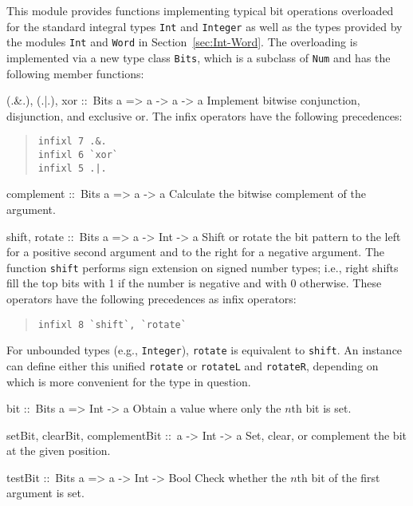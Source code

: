 \documentclass[a4paper,twoside]{article}
\makeatletter
\newcommand{\code}[1]{\texttt{#1}}      %
\newenvironment{codedesc}{%
  \list{}{\labelwidth\z@
    \let\makelabel\codedesclabel}
  }{%
  \endlist
  }
\newcommand*{\codedesclabel}[1]{%
  \hspace{-\leftmargin}
  \parbox[b]{\labelwidth}{\makebox[0pt][l]{\code{#1}}\\}\hfil\relax
  }
\makeatother
\begin{document}
This module provides functions implementing typical bit operations overloaded
for the standard integral types \code{Int} and \code{Integer} as well as the
types provided by the modules \code{Int} and \code{Word} in
Section~\ref{sec:Int-Word}.  The overloading is implemented via a new type
class \code{Bits}, which is a subclass of \code{Num} and has the following
member functions:
%
\begin{codedesc}
\item[(.\&.), (.|.), xor ::\ Bits a => a -> a -> a]  Implement bitwise
  conjunction, disjunction, and exclusive or.  The infix operators have the
  following precedences:
  \begin{quote}
\begin{verbatim}
infixl 7 .&.
infixl 6 `xor`
infixl 5 .|.
\end{verbatim}
  \end{quote}
  
\item[complement ::\ Bits a => a -> a] Calculate the bitwise complement of the
  argument.

\item[shift, rotate ::\ Bits a => a -> Int -> a] Shift or rotate the bit
  pattern to the left for a positive second argument and to the right for a
  negative argument.  The function \code{shift} performs sign extension on
  signed number types; i.e., right shifts fill the top bits with 1 if the
  number is negative and with 0 otherwise.  These operators have the following
  precedences as infix operators:
  \begin{quote}
\begin{verbatim}
infixl 8 `shift`, `rotate`
\end{verbatim}
  \end{quote}
  For unbounded types (e.g., \code{Integer}), \code{rotate} is equivalent to
  \code{shift}.  An instance can define either this unified \code{rotate} or
  \code{rotateL} and \code{rotateR}, depending on which is more convenient for
  the type in question.

\item[bit ::\ Bits a => Int -> a] Obtain a value where only the $n$th bit
  is set.
  
\item[setBit, clearBit, complementBit ::\ a -> Int -> a] Set, clear, or
  complement the bit at the given position.
  
\item[testBit ::\ Bits a => a -> Int -> Bool] Check whether the $n$th bit of
  the first argument is set.


\end{codedesc}
\end{document}
